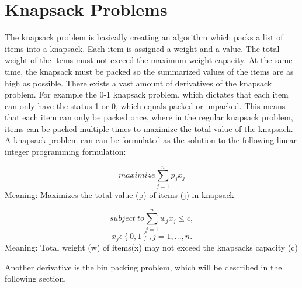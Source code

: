 \section{Knapsack Problems}
\label{sec:knapsack}
The knapsack problem is basically creating an algorithm which packs a list of items into a knapsack. Each item is assigned a weight and a value. The total weight of the items must not exceed the maximum weight capacity. At the same time, the knapsack must be packed so the summarized values of the items are as high as possible. There exists a vast amount of derivatives of the knapsack problem. For example the 0-1 knapsack problem\citep{knapsackproblems}, which dictates that each item can only have the status 1 or 0, which equals packed or unpacked. This means that each item can only be packed once, where in the regular knapsack problem, items can be packed multiple times to maximize the total value of the knapsack. A knapsack problem can can be formulated as the solution to the following linear integer programming formulation:


\[maximize \sum\limits_{j=1}^n p_jx_j\]
Meaning: Maximizes the total value (p) of items (j) in knapsack

\[subject~to \sum\limits_{j=1}^n w_jx_j\leq c,\]
\[x_j \epsilon \left \{ 0,1 \right \}, j=1,...,n.\]
Meaning: Total weight (w) of items(x) may not exceed the knapsacks capacity (c)

 \citep{knapsackproblems}
\newline
Another derivative is the bin packing problem, which will be described in the following section.